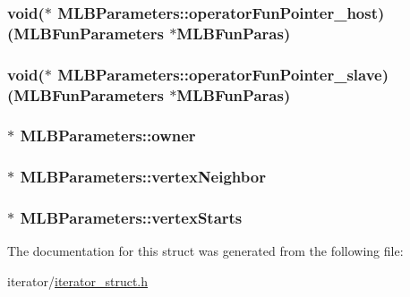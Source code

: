\label{structMLBParameters_a2f37a3f6bfcd23b1f2e57c613325484d}
\hypertarget{structMLBParameters_ad7a8768b3710ff857ab156bf24db6548}{
\subsubsection[{operatorFunPointer\_\-host}]{\setlength{\rightskip}{0pt plus 5cm}void($\ast$ {\bf MLBParameters::operatorFunPointer\_\-host})({\bf MLBFunParameters} $\ast$MLBFunParas)}}
\label{structMLBParameters_ad7a8768b3710ff857ab156bf24db6548}
\hypertarget{structMLBParameters_aec73e8d9f7b561d3a80658ee8a3eb397}{
\subsubsection[{operatorFunPointer\_\-slave}]{\setlength{\rightskip}{0pt plus 5cm}void($\ast$ {\bf MLBParameters::operatorFunPointer\_\-slave})({\bf MLBFunParameters} $\ast$MLBFunParas)}}
\label{structMLBParameters_aec73e8d9f7b561d3a80658ee8a3eb397}
\hypertarget{structMLBParameters_ac7483bc6365005100466360bb542fc31}{
\subsubsection[{owner}]{$\ast$ {\bf MLBParameters::owner}}}
\label{structMLBParameters_ac7483bc6365005100466360bb542fc31}
\hypertarget{structMLBParameters_aed04421df60bb1fa6144f4f8b03b789a}{
\subsubsection[{vertexNeighbor}]{$\ast$ {\bf MLBParameters::vertexNeighbor}}}
\label{structMLBParameters_aed04421df60bb1fa6144f4f8b03b789a}
\hypertarget{structMLBParameters_aba1b1654ae819032fd78dac4febe0101}{
\subsubsection[{vertexStarts}]{$\ast$ {\bf MLBParameters::vertexStarts}}}
\label{structMLBParameters_aba1b1654ae819032fd78dac4febe0101}


The documentation for this struct was generated from the following file:\begin{DoxyCompactItemize}
\item 
iterator/\hyperlink{iterator__struct_8h}{iterator\_\-struct.h}\end{DoxyCompactItemize}

